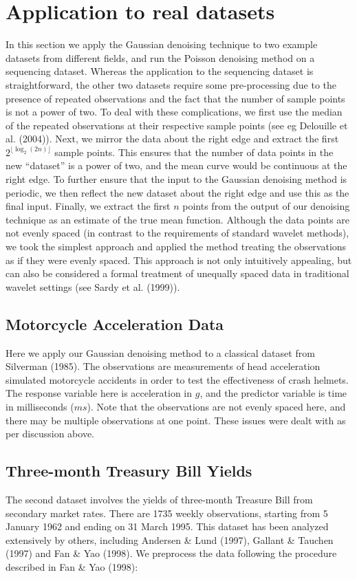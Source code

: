 \documentclass[12pt]{article}
\begin{document}
\section{Application to real datasets}
In this section we apply the Gaussian denoising technique to two example datasets from different fields, and run the Poisson denoising method on a sequencing dataset. Whereas the application to the sequencing dataset is straightforward, the other two datasets require some pre-processing due to the presence of repeated observations and the fact that the number of sample points is not a power of two. To deal with these complications, we first use the median of the repeated observations at their respective sample points (see eg Delouille et al. (2004)). Next, we mirror the data about the right edge and extract the first $2^{\lfloor\log_2(2n)\rfloor}$ sample points. This ensures that the number of data points in the new ``dataset'' is a power of two, and the mean curve would be continuous at the right edge. To further ensure that the input to the Gaussian denoising method is periodic, we then reflect the new dataset about the right edge and use this as the final input. Finally, we extract the first $n$ points from the output of our denoising technique as an estimate of the true mean function. Although the data points are not evenly spaced (in contrast to the requirements of standard wavelet methods), we took the simplest approach and applied the method treating the observations as if they were evenly spaced. This approach is not only intuitively appealing, but can also be considered a formal treatment of unequally spaced data in traditional wavelet settings (see Sardy et al. (1999)). 
\subsection{Motorcycle Acceleration Data}
Here we apply our Gaussian denoising method to a classical dataset from Silverman (1985). The observations are measurements of head acceleration simulated motorcycle accidents in order to test the effectiveness of crash helmets. The response variable here is acceleration in $g$, and the predictor variable is time in milliseconds ($ms$). Note that the observations are not evenly spaced here, and there may be multiple observations at one point. These issues were dealt with as per discussion above. 
\subsection{Three-month Treasury Bill Yields}
The second dataset involves the yields of three-month Treasure Bill from secondary market rates. There are 1735 weekly observations, starting from 5 January 1962 and ending on 31 March 1995. This dataset has been analyzed extensively by others, including Andersen \& Lund (1997), Gallant \& Tauchen (1997) and Fan \& Yao (1998). We preprocess the data following the procedure described in Fan \& Yao (1998):
\end{document}
